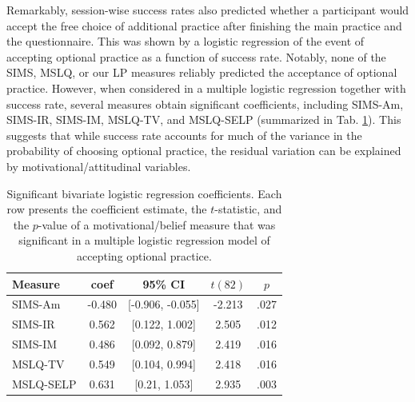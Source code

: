 Remarkably, session-wise success rates also predicted whether a participant would accept the free choice of additional practice after finishing the main practice and the questionnaire. This was shown by a logistic regression of the event of accepting optional practice as a function of success rate. Notably, none of the \ac{SIMS}, \ac{MSLQ}, or our \ac{LP} measures reliably predicted the acceptance of optional practice. However, when considered in a multiple logistic regression together with success rate, several measures obtain significant coefficients, including \ac{SIMS}-Am, \ac{SIMS}-IR, \ac{SIMS}-IM, \ac{MSLQ}-TV, and \ac{MSLQ}-SELP (summarized in Tab. \ref{tab:5-multiple_regs}). This suggests that while success rate accounts for much of the variance in the probability of choosing optional practice, the residual variation can be explained by motivational/attitudinal variables.

\begin{table}
    \myfloatalign
    \begin{tabularx}{\textwidth}{Xcccc}
        \toprule
        Measure &   coef & 95\% CI &   $t(82)$  &    $p$ \\
        \hline
        \ac{SIMS}-Am & -0.480 &  [-0.906, -0.055] & -2.213 &  .027 \\
        \ac{SIMS}-IR &  0.562 &    [0.122, 1.002] &  2.505 &  .012 \\
        \ac{SIMS}-IM &  0.486 &    [0.092, 0.879] &  2.419 &  .016 \\
        \ac{MSLQ}-TV &  0.549 &    [0.104, 0.994] &  2.418 &  .016 \\
        \ac{MSLQ}-SELP &  0.631 &     [0.21, 1.053] &  2.935 &  .003 \\
        \hline
    \end{tabularx}
    \caption[short table description]{Significant bivariate logistic regression coefficients. Each row presents the coefficient estimate, the $t$-statistic, and  the $p$-value of a motivational/belief measure that was significant in a multiple logistic regression model of accepting optional practice.}  \label{tab:5-multiple_regs}
\end{table}

